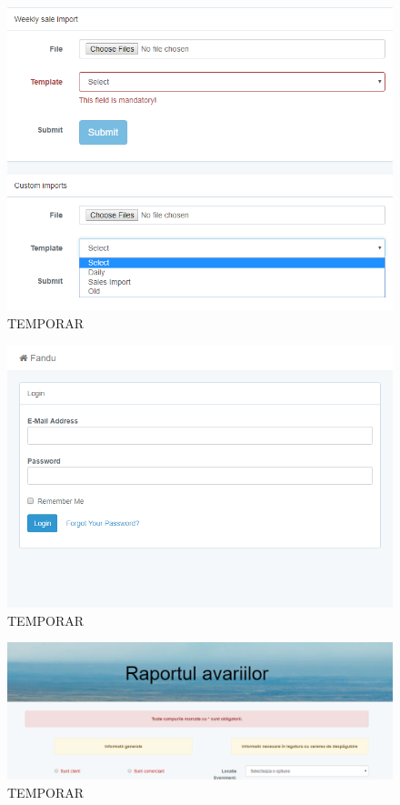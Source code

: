 	\begin{figure}
		\includegraphics[width=\linewidth]{../imagini/imports.png}
		\caption{TEMPORAR}
		\label{fig:TEMP}
	\end{figure}
	\begin{figure}
		\includegraphics[width=\linewidth]{../imagini/login.png}
		\caption{TEMPORAR}
		\label{fig:TEMP}
	\end{figure}
	\begin{figure}
		\includegraphics[width=\linewidth]{../imagini/main.png}
		\caption{TEMPORAR}
		\label{fig:TEMP}
	\end{figure}

